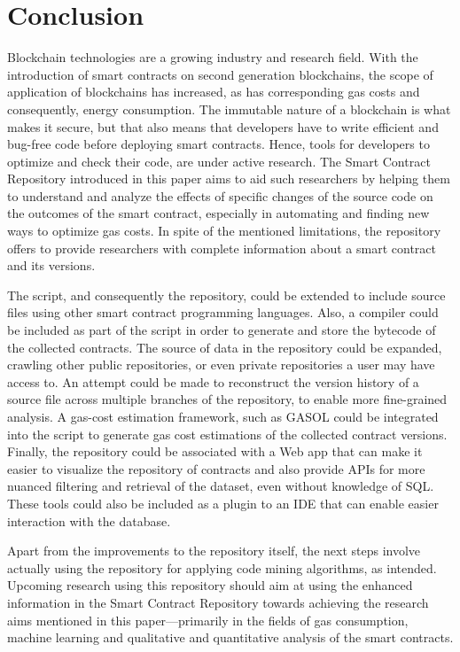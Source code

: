 \documentclass[10pt,conference]{IEEEtran}
\begin{document}
	\section{Conclusion}
	\label{sec:conclusion}
	
	Blockchain technologies are a growing industry and research field. With the introduction of smart contracts on second generation blockchains, the scope of application of blockchains has increased, as has corresponding gas costs and consequently, energy consumption. The immutable nature of a blockchain is what makes it secure, but that also means that developers have to write efficient and bug-free code before deploying smart contracts. Hence, tools for developers to optimize and check their code, are under active research. The Smart Contract Repository introduced in this paper aims to aid such researchers by helping them to understand and analyze the effects of specific changes of the source code on the outcomes of the smart contract, especially in automating and finding new ways to optimize gas costs. In spite of the mentioned limitations, the repository offers to provide researchers with complete information about a smart contract and its versions.
	
The script, and consequently the repository, could be extended to include source files using other smart contract programming languages. Also, a compiler could be included as part of the script in order to generate and store the bytecode of the collected contracts. The source of data in the repository could be expanded, crawling other public repositories, or even private repositories a user may have access to. An attempt could be made to reconstruct the version history of a source file across multiple branches of the repository, to enable more fine-grained analysis. A gas-cost estimation framework, such as GASOL \cite{gasol} could be integrated into the script to generate gas cost estimations of the collected contract versions. Finally, the repository could be associated with a Web app that can make it easier to visualize the repository of contracts and also provide APIs for more nuanced filtering and retrieval of the dataset, even without knowledge of SQL. These tools could also be included as a plugin to an IDE that can enable easier interaction with the database.
	
	Apart from the improvements to the repository itself, the next steps involve actually using the repository for applying code mining algorithms, as intended. Upcoming research using this repository should aim at using the enhanced information in the Smart Contract Repository towards achieving the research aims mentioned in this paper---primarily in the fields of gas consumption, machine learning and qualitative and quantitative analysis of the smart contracts.
	
\end{document}
